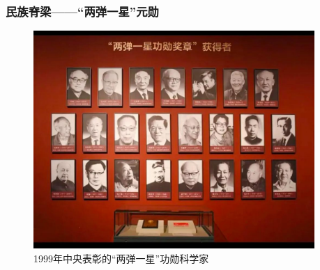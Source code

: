 \begin{frame}
    \frametitle{民族脊梁——``两弹一星''元勋}
    \vspace{-0.4cm}
            \begin{figure}
                \includegraphics[width=0.95\textwidth]{Figures_History/Collection_23-1.jpeg}
		\caption{\tiny{\textrm{1999}年中央表彰的``两弹一星''功勋科学家}}
            \end{figure}
\end{frame}

